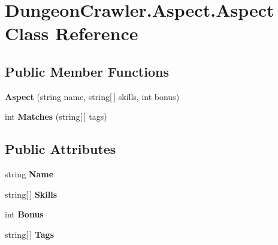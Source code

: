 \hypertarget{class_dungeon_crawler_1_1_aspect_1_1_aspect}{}\section{Dungeon\+Crawler.\+Aspect.\+Aspect Class Reference}
\label{class_dungeon_crawler_1_1_aspect_1_1_aspect}
\subsection*{Public Member Functions}
\begin{DoxyCompactItemize}
\item 
\hypertarget{class_dungeon_crawler_1_1_aspect_1_1_aspect_acbb9c550371da31ddfedf7b387d94685}{}{\bfseries Aspect} (string name, string\mbox{[}$\,$\mbox{]} skills, int bonus)\label{class_dungeon_crawler_1_1_aspect_1_1_aspect_acbb9c550371da31ddfedf7b387d94685}

\item 
\hypertarget{class_dungeon_crawler_1_1_aspect_1_1_aspect_ae55c89e295a10d8221a55b3cffde1c39}{}int {\bfseries Matches} (string\mbox{[}$\,$\mbox{]} tags)\label{class_dungeon_crawler_1_1_aspect_1_1_aspect_ae55c89e295a10d8221a55b3cffde1c39}

\end{DoxyCompactItemize}
\subsection*{Public Attributes}
\begin{DoxyCompactItemize}
\item 
\hypertarget{class_dungeon_crawler_1_1_aspect_1_1_aspect_a5506b2b5f270d5efb91f65113fcc1b9c}{}string {\bfseries Name}\label{class_dungeon_crawler_1_1_aspect_1_1_aspect_a5506b2b5f270d5efb91f65113fcc1b9c}

\item 
\hypertarget{class_dungeon_crawler_1_1_aspect_1_1_aspect_a5b8a60b7687b4973c60acd80fc9ca0ac}{}string\mbox{[}$\,$\mbox{]} {\bfseries Skills}\label{class_dungeon_crawler_1_1_aspect_1_1_aspect_a5b8a60b7687b4973c60acd80fc9ca0ac}

\item 
\hypertarget{class_dungeon_crawler_1_1_aspect_1_1_aspect_a2fa30dba12cb0d9d6492e510f58b3a4a}{}int {\bfseries Bonus}\label{class_dungeon_crawler_1_1_aspect_1_1_aspect_a2fa30dba12cb0d9d6492e510f58b3a4a}

\item 
\hypertarget{class_dungeon_crawler_1_1_aspect_1_1_aspect_aec551622d5acd51e36c7f619eb7b82a0}{}string\mbox{[}$\,$\mbox{]} {\bfseries Tags}\label{class_dungeon_crawler_1_1_aspect_1_1_aspect_aec551622d5acd51e36c7f619eb7b82a0}

\end{DoxyCompactItemize}
